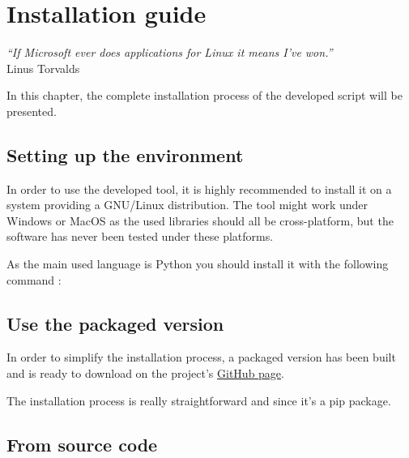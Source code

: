 

\chapter{Installation guide} %
\label{chap:installation}
\begin{flushright}
\textit{``If Microsoft ever does applications for Linux it means I've won.''} \\ Linus Torvalds
\end{flushright}


In this chapter, the complete installation process of the developed script will be presented.

\section {Setting up the environment}

In order to use the developed tool, it is highly recommended to install it on a system providing a GNU/Linux distribution. The tool might work under Windows or MacOS as the used libraries should all be cross-platform, but the software has never been tested under these platforms.

As the main used language is Python you should install it with the following command :


\section{Use the packaged version}
In order to simplify the installation process, a packaged version has been built and is ready to download on the project's \href{https://github.com/dchenaux/Yoda}{GitHub page}.

The installation process is really straightforward and since it's a \gls{pip} package.

\section{From source code}
